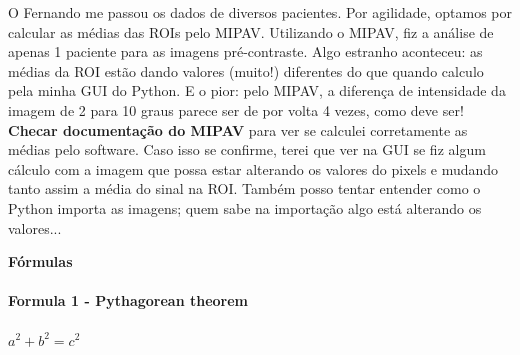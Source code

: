 \documentclass[idxtotoc,hyperref,openany]{labbook} %
\begin{document}
O Fernando me passou os dados de diversos pacientes. Por agilidade, optamos por calcular as médias das ROIs pelo MIPAV. Utilizando o MIPAV, fiz a análise de apenas 1 paciente para as imagens pré-contraste. Algo estranho aconteceu: as médias da ROI estão dando valores (muito!) diferentes do que quando calculo pela minha GUI do Python. E o pior: pelo MIPAV, a diferença de intensidade da imagem de 2 para 10 graus parece ser de por volta 4 vezes, como deve ser! \textbf{Checar documentação do MIPAV} para ver se calculei corretamente as médias pelo software. Caso isso se confirme, terei que ver na GUI se fiz algum cálculo com a imagem que possa estar alterando os valores do pixels e mudando tanto assim a média do sinal na ROI. Também posso tentar entender como o Python importa as imagens; quem sabe na importação algo está alterando os valores...


\newpage

\huge \textbf{Fórmulas} \\ \\

\normalsize \textbf{Formula 1 - Pythagorean theorem}\\ \\
$a^2 + b^2 = c^2$\\ \\




\end{document}
